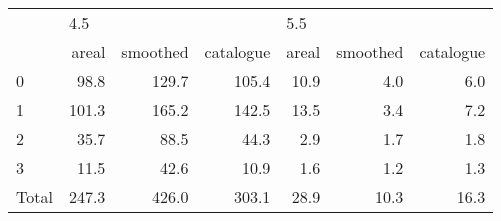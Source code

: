 \begin{tabular}{lrrrrrr}
\toprule
{} & \multicolumn{3}{l}{4.5} & \multicolumn{3}{l}{5.5} \\
{} &  areal & smoothed & catalogue & areal & smoothed & catalogue \\
\midrule
0     &   98.8 &    129.7 &     105.4 &  10.9 &      4.0 &       6.0 \\
1     &  101.3 &    165.2 &     142.5 &  13.5 &      3.4 &       7.2 \\
2     &   35.7 &     88.5 &      44.3 &   2.9 &      1.7 &       1.8 \\
3     &   11.5 &     42.6 &      10.9 &   1.6 &      1.2 &       1.3 \\
Total &  247.3 &    426.0 &     303.1 &  28.9 &     10.3 &      16.3 \\
\bottomrule
\end{tabular}
